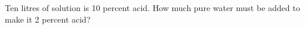 Ten litres of solution is 10 percent acid. How much pure water must be added to make it 2 percent acid?
